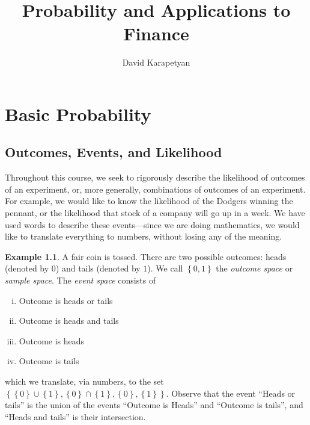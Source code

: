 \documentclass[12pt]{amsbook}
\theoremstyle{plain}
\theoremstyle{definition}
\newtheorem*{example}{Example}
\theoremstyle{remark}
\numberwithin{equation}{section}  %
\begin{document}
\title{Probability and Applications to Finance}
\author{David Karapetyan}
\maketitle
\tableofcontents
\part{Basic Probability}
\chapter{Outcomes, Events, and Likelihood}
Throughout this course, we seek to rigorously describe the likelihood of
outcomes of an experiment, or, more generally, combinations of outcomes of an 
experiment.
For example, we would like to know the likelihood of the Dodgers
winning the pennant, or the likelihood that stock of a company will go up
in a week. We have used words to describe these events---since we are doing
mathematics, we would like to translate everything to numbers, without losing
any of the meaning.
\begin{example}
	A fair coin is tossed. There are two possible outcomes: heads (denoted by 
	$0$) 
	and tails (denoted by $1$). We call $ \left\{ 0,1 \right\} $ the 
	\emph{outcome
	space} or \emph{sample space}. The \emph{event space} consists of
	\begin{enumerate}[(i)]
		\item Outcome is heads or tails
		\item Outcome is heads and tails
		\item Outcome is heads
		\item Outcome is tails
	\end{enumerate}
	which we translate, via numbers, to the set $ \left\{ \left\{ 0 \right\} 
	\cup
	\left\{ 1 \right\}, \left\{ 0 \right\} \cap \left\{ 1 \right\} , \left\{ 0
	\right\} , \left\{ 1 \right\} \right \}$.
	Observe that the event ``Heads or tails'' is the union of the events
	``Outcome is Heads'' and ``Outcome is tails'', and ``Heads and tails'' is
	their intersection.
\end{example}	
\end{document}
